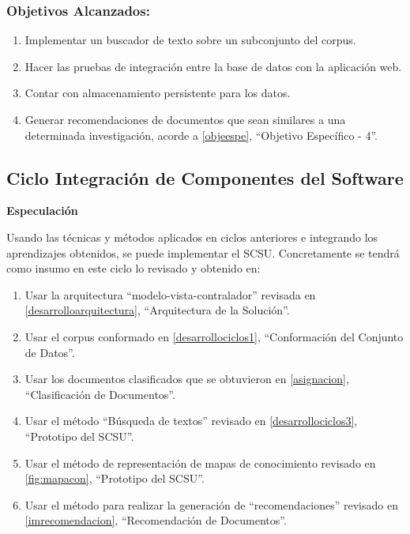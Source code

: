 \documentclass[
  12pt,
  openany]{book}
\begin{document}
\hypertarget{objetivos-alcanzados-1}{%
\subsubsection{Objetivos Alcanzados:}\label{objetivos-alcanzados-1}}

\begin{enumerate}
\def\labelenumi{\arabic{enumi}.}
\item
  Implementar un buscador de texto sobre un subconjunto del corpus.
\item
  Hacer las pruebas de integración entre la base de datos con la aplicación web.
\item
  Contar con almacenamiento persistente para los datos.
\item
  Generar recomendaciones de documentos que sean similares a una determinada investigación, acorde a \ref{objeespe}, ``Objetivo Específico - 4''.
\end{enumerate}

\newpage

\hypertarget{desarrollociclos4}{%
\subsection{Ciclo Integración de Componentes del Software}\label{desarrollociclos4}}

\textbf{Especulación}

Usando las técnicas y métodos aplicados en ciclos anteriores e integrando los aprendizajes obtenidos, se puede implementar el SCSU. Concretamente se tendrá como insumo en este ciclo lo revisado y obtenido en:

\begin{enumerate}
\def\labelenumi{\arabic{enumi}.}
\item
  Usar la arquitectura ``modelo-vista-contralador'' revisada en \ref{desarrolloarquitectura}, ``Arquitectura de la Solución''.
\item
  Usar el corpus conformado en \ref{desarrollociclos1}, ``Conformación del Conjunto de Datos''.
\item
  Usar los documentos clasificados que se obtuvieron en \ref{asignacion}, ``Clasificación de Documentos''.
\item
  Usar el método ``Búsqueda de textos'' revisado en \ref{desarrollociclos3}, ``Prototipo del SCSU''.
\item
  Usar el método de representación de mapas de conocimiento revisado en \ref{fig:mapacon}, ``Prototipo del SCSU''.
\item
  Usar el método para realizar la generación de ``recomendaciones'' revisado en \ref{imrecomendacion}, ``Recomendación de Documentos''.
\end{enumerate}
\end{document}
